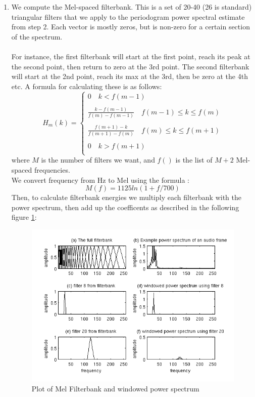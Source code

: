 \documentclass{article} %
\begin{document}
\begin{enumerate}
		\item We compute the Mel-spaced filterbank. This is a set of 20-40 (26 is standard) triangular filters that we apply to the periodogram power spectral estimate from step 2. Each vector is mostly zeros, but is non-zero for a certain section of the spectrum. \\\\
		For instance, the first filterbank will start at the first point, reach its peak at the second point, then return to zero at the 3rd point. The second filterbank will start at the 2nd point, reach its max at the 3rd, then be zero at the 4th etc. A formula for calculating these is as follows:\\
		\[H_m(k) =
			\begin{cases}
				0 \quad k < f(m-1) \\\\
				\frac{k-f(m-1)}{f(m)-f(m-1)} \quad f(m-1) \leq k \leq f(m) \\\\
				\frac{f(m+1)-k}{f(m+1)-f(m)} \quad f(m) \leq k \leq f(m+1) \\\\
				0 \quad k > f(m+1) \\
			\end{cases}
		\]
		where $M$ is the number of filters we want, and $f()$ is the list of $M+2$ Mel-spaced frequencies.\\
		We convert frequency from Hz to Mel using the formula :\\
		$$ M(f) = 1125 ln(1 + f/700) $$
		Then, to calculate filterbank energies we multiply each filterbank with the power spectrum, then add up the coefficents as described in the following figure \ref{fig:melfilterbank}:
		\begin{figure}[H]
		  \includegraphics[width=\linewidth]{mel_filterbank_example}
		  \caption{Plot of Mel Filterbank and windowed power spectrum}
		  \label{fig:melfilterbank}
	  	\end{figure}


\end{enumerate}
\end{document}
